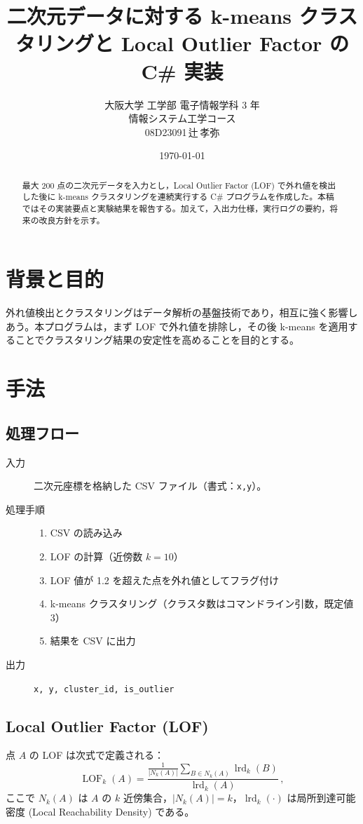 \documentclass[a4j,dvipdfmx]{jsarticle}
\title{二次元データに対する k-means クラスタリングと Local Outlier Factor の C\# 実装}
\author{大阪大学 工学部 電子情報学科 3 年\\情報システム工学コース\\08D23091\,辻\,孝弥}
\date{\today}
\begin{document}
\maketitle
\tableofcontents
\newpage

\begin{abstract}
最大 200 点の二次元データを入力とし，Local Outlier Factor (LOF) で外れ値を検出した後に k-means クラスタリングを連続実行する C\# プログラムを作成した。本稿ではその実装要点と実験結果を報告する。加えて，入出力仕様，実行ログの要約，将来の改良方針を示す。
\end{abstract}

\section{背景と目的}
外れ値検出とクラスタリングはデータ解析の基盤技術であり，相互に強く影響しあう。本プログラムは，まず LOF で外れ値を排除し，その後 k-means を適用することでクラスタリング結果の安定性を高めることを目的とする。

\section{手法}
\subsection{処理フロー}
\begin{description}
  \item[入力] 二次元座標を格納した CSV ファイル（書式：\texttt{x,y}）。
  \item[処理手順]
    \begin{enumerate}
      \item CSV の読み込み
      \item LOF の計算（近傍数 $k=10$）
      \item LOF 値が 1.2 を超えた点を外れ値としてフラグ付け
      \item k-means クラスタリング（クラスタ数はコマンドライン引数，既定値 3）
      \item 結果を CSV に出力
    \end{enumerate}
  \item[出力] \texttt{x, y, cluster\_id, is\_outlier}
\end{description}

\subsection{Local Outlier Factor (LOF)}
点 $A$ の LOF は次式で定義される：
\begin{equation}
  \operatorname{LOF}_k(A)=\frac{\displaystyle\frac{1}{|N_k(A)|}\sum_{B\in N_k(A)} \operatorname{lrd}_k(B)}{\operatorname{lrd}_k(A)}\, ,
  \label{eq:lof}
\end{equation}
ここで $N_k(A)$ は $A$ の $k$ 近傍集合，$|N_k(A)|=k$，$\operatorname{lrd}_k(\cdot)$ は局所到達可能密度 (Local Reachability Density) である。
\end{document}
